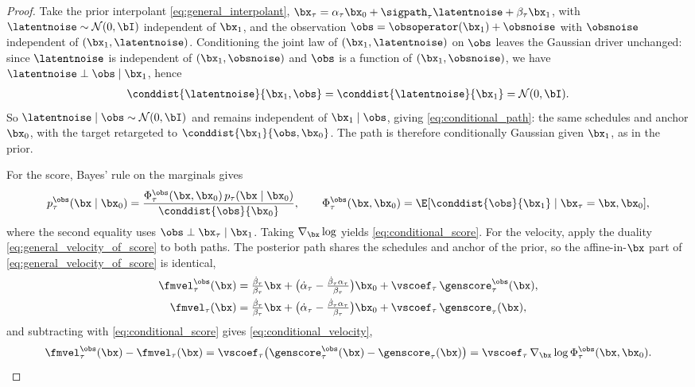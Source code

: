 \begin{proof}
Take the prior interpolant \eqref{eq:general_interpolant}, $\bx_\tau = \alpha_\tau\bx_0 + \sigpath_\tau\latentnoise + \beta_\tau\bx_1$, with $\latentnoise\sim\mathcal{N}(0,\bI)$ independent of $\bx_1$, and the observation $\obs = \obsoperator(\bx_1) + \obsnoise$ with $\obsnoise$ independent of $(\bx_1,\latentnoise)$. Conditioning the joint law of $(\bx_1,\latentnoise)$ on $\obs$ leaves the Gaussian driver unchanged: since $\latentnoise$ is independent of $(\bx_1,\obsnoise)$ and $\obs$ is a function of $(\bx_1,\obsnoise)$, we have $\latentnoise \perp \obs \mid \bx_1$, hence
\begin{align}
    \conddist{\latentnoise}{\bx_1,\obs} = \conddist{\latentnoise}{\bx_1} = \mathcal{N}(0,\bI).
\end{align}
So $\latentnoise\mid\obs\sim\mathcal{N}(0,\bI)$ and remains independent of $\bx_1\mid\obs$, giving \eqref{eq:conditional_path}: the same schedules and anchor $\bx_0$, with the target retargeted to $\conddist{\bx_1}{\obs,\bx_0}$. The path is therefore conditionally Gaussian given $\bx_1$, as in the prior.

For the score, Bayes' rule on the marginals gives
\begin{align}\label{eq:posterior_marginal}
    p_\tau^{\obs}(\bx\mid\bx_0) = \frac{\Phi_\tau^{\obs}(\bx,\bx_0)\,p_\tau(\bx\mid\bx_0)}{\conddist{\obs}{\bx_0}},
    \qquad
    \Phi_\tau^{\obs}(\bx,\bx_0)=\E[\conddist{\obs}{\bx_1}\mid\bx_\tau=\bx,\bx_0],
\end{align}
where the second equality uses $\obs\perp\bx_\tau\mid\bx_1$. Taking $\nabla_{\bx}\log$ yields \eqref{eq:conditional_score}. For the velocity, apply the duality \eqref{eq:general_velocity_of_score} to both paths. The posterior path shares the schedules and anchor of the prior, so the affine-in-$\bx$ part of \eqref{eq:general_velocity_of_score} is identical,
\begin{align}
    \fmvel_\tau^{\obs}(\bx)
    &= \tfrac{\dot\beta_\tau}{\beta_\tau}\bx + \big(\dot\alpha_\tau - \tfrac{\dot\beta_\tau\alpha_\tau}{\beta_\tau}\big)\bx_0 + \vscoef_\tau\,\genscore_\tau^{\obs}(\bx), \\
    \fmvel_\tau(\bx)
    &= \tfrac{\dot\beta_\tau}{\beta_\tau}\bx + \big(\dot\alpha_\tau - \tfrac{\dot\beta_\tau\alpha_\tau}{\beta_\tau}\big)\bx_0 + \vscoef_\tau\,\genscore_\tau(\bx),
\end{align}
and subtracting with \eqref{eq:conditional_score} gives \eqref{eq:conditional_velocity},
\begin{align}
    \fmvel_\tau^{\obs}(\bx) - \fmvel_\tau(\bx)
    = \vscoef_\tau\big(\genscore_\tau^{\obs}(\bx) - \genscore_\tau(\bx)\big)
    = \vscoef_\tau\,\nabla_{\bx}\log\Phi_\tau^{\obs}(\bx,\bx_0). \qedhere
\end{align}
\end{proof}

